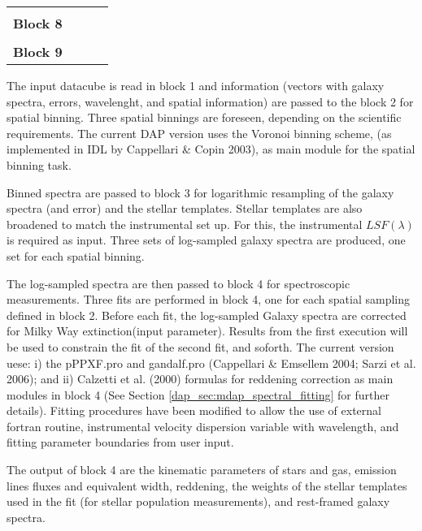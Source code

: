 \begin{table}
\begin{scriptsize}
\begin{tabular}{l |l |l | l}
\hline
              &                                 &  &  \\  
{\bf Block 8} &                                 &                                &  \\
\hline
              &                                 &  &  \\  
{\bf Block 9} &                                 &                                &  \\
\hline
\hline
\end{tabular}
\end{scriptsize}
\label{dap_tab:modules}
\end{table}

The input datacube is read in block 1 and information (vectors with
galaxy spectra, errors, wavelenght, and spatial information) are
passed to the block 2 for spatial binning. Three spatial binnings are
foreseen, depending on the scientific requirements. The current DAP
version uses the Voronoi binning scheme, (as implemented in IDL by
Cappellari \& Copin 2003), as main module for the spatial binning
task.

Binned spectra are passed to block 3 for logarithmic resampling of the
galaxy spectra (and error) and the stellar templates. Stellar
templates are also broadened to match the instrumental set up. For
this, the instrumental $LSF(\lambda)$ is required as input. Three sets
of log-sampled galaxy spectra are produced, one set for each spatial
binning.

The log-sampled spectra are then passed to block 4 for spectroscopic
measurements. Three fits are performed in block 4, one for each
spatial sampling defined in block 2. Before each fit, the log-sampled
Galaxy spectra are corrected for Milky Way extinction(input
parameter). Results from the first execution will be used to constrain
the fit of the second fit, and soforth. The current version uese: i)
the pPPXF.pro and gandalf.pro (Cappellari \& Emsellem 2004; Sarzi et
al. 2006); and ii) Calzetti et al. (2000) formulas for reddening
correction as main modules in block 4 (See Section
\ref{dap_sec:mdap_spectral_fitting} for further details). Fitting
procedures have been modified to allow the use of external fortran
routine, instrumental velocity dispersion variable with wavelength,
and fitting parameter boundaries from user input.

The output of block 4 are the kinematic
parameters of stars and gas, emission lines fluxes and equivalent
width, reddening, the weights of the stellar templates used in the fit
(for stellar population measurements), and rest-framed galaxy spectra.

